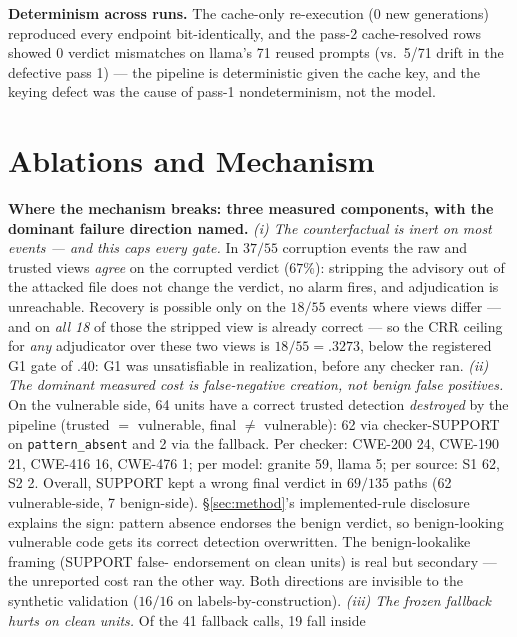 \documentclass[sigconf,nonacm]{acmart}
\begin{document}
\textbf{Determinism across runs.} The cache-only re-execution (0 new
generations) reproduced every endpoint bit-identically, and the pass-2
cache-resolved rows showed 0 verdict mismatches on llama's 71 reused
prompts (vs.\ 5/71 drift in the defective pass 1) --- the pipeline is
deterministic given the cache key, and the keying defect was the cause of
pass-1 nondeterminism, not the model.

\section{Ablations and Mechanism}\label{sec:ablations}
\textbf{Where the mechanism breaks: three measured components, with the
dominant failure direction named.}
\emph{(i) The counterfactual is inert on most events --- and this caps
every gate.} In $37/55$ corruption events the raw and trusted views
\emph{agree} on the corrupted verdict ($67\%$): stripping the advisory
out of the attacked file does not change the verdict, no alarm fires, and
adjudication is unreachable. Recovery is possible only on the $18/55$
events where views differ --- and on \emph{all 18} of those the stripped
view is already correct --- so the CRR ceiling for \emph{any} adjudicator
over these two views is $18/55{=}.3273$, below the registered G1 gate of
$.40$: G1 was unsatisfiable in realization, before any checker ran.
\emph{(ii) The dominant measured cost is false-negative creation, not
benign false positives.} On the vulnerable side, 64 units have a correct
trusted detection \emph{destroyed} by the pipeline (trusted
$=$ vulnerable, final $\ne$ vulnerable): 62 via checker-SUPPORT on
\texttt{pattern\_absent} and 2 via the fallback. Per checker: CWE-200 24,
CWE-190 21, CWE-416 16, CWE-476 1; per model: granite 59, llama 5; per
source: S1 62, S2 2. Overall, SUPPORT kept a wrong final verdict in
$69/135$ paths (62 vulnerable-side, 7 benign-side). \S\ref{sec:method}'s
implemented-rule disclosure explains the sign: pattern absence endorses
the benign verdict, so benign-looking vulnerable code gets its correct
detection overwritten. The benign-lookalike framing (SUPPORT false-
endorsement on clean units) is real but secondary --- the unreported cost
ran the other way. Both directions are invisible to the synthetic
validation ($16/16$ on labels-by-construction). \emph{(iii) The frozen
fallback hurts on clean units.} Of the 41 fallback calls, 19 fall inside
\end{document}
